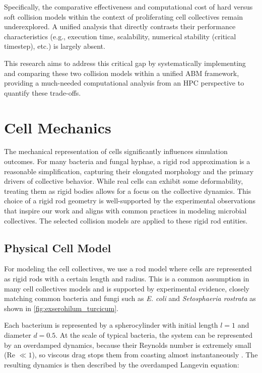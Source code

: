 \documentclass[conference]{IEEEtran}
\begin{document}
Specifically, the comparative effectiveness and computational cost of hard versus soft collision models within the context of proliferating cell collectives remain underexplored. A unified analysis that directly contrasts their performance characteristics (e.g., execution time, scalability, numerical stability (critical timestep), etc.) is largely absent.

This research aims to address this critical gap by systematically implementing and comparing these two collision models within a unified ABM framework, providing a much-needed computational analysis from an HPC perspective to quantify these trade-offs.

\section{Cell Mechanics}

The mechanical representation of cells significantly influences simulation outcomes. For many bacteria and fungal hyphae, a rigid rod approximation is a reasonable simplification, capturing their elongated morphology and the primary drivers of collective behavior. While real cells can exhibit some deformability, treating them as rigid bodies allows for a focus on the collective dynamics. This choice of a rigid rod geometry is well-supported by the experimental observations that inspire our work and aligns with common practices in modeling microbial collectives. The selected collision models are applied to these rigid rod entities.

\subsection{Physical Cell Model}

For modeling the cell collectives, we use a rod model where cells are represented as rigid rods with a certain length and radius. This is a common assumption in many cell collectives models \cite{You2018}\cite{Weady2024}\cite{Blanchard2015}\cite{Warren2019}\cite{Ghosh2015} and is supported by experimental evidence, closely matching common bacteria and fungi such as \textit{E. coli} and \textit{Setosphaeria rostrata} as shown in \autoref{fig:exserohilum_turcicum}.


Each bacterium is represented by a spherocylinder with initial length $l=1$ and diameter $d=0.5$. At the scale of typical bacteria, the system can be represented by an overdamped dynamics, because their Reynolds number is extremely small (Re $\ll 1$), so viscous drag stops them from coasting almost instantaneously \cite{datta2024lifelowreynoldsnumber}. The resulting dynamics is then described by the overdamped Langevin equation:
\end{document}
